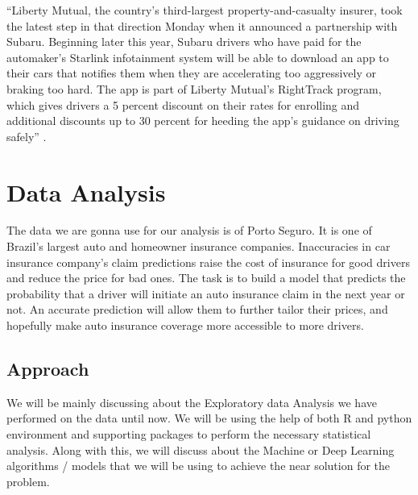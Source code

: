 ``Liberty Mutual, the country's third-largest property-and-casualty insurer, took the latest step in that direction Monday when it announced a partnership with Subaru. Beginning later this year, Subaru drivers who have paid for the automaker's Starlink infotainment system will be able to download an app to their cars that notifies them when they are accelerating too aggressively or braking too hard. The app is part of Liberty Mutual's RightTrack program, which gives drivers a 5 percent discount on their rates for enrolling and additional discounts up to 30 percent for heeding the app's guidance on driving safely'' \cite{Fung2016turn}. 

\section{Data Analysis}
The data we are gonna use for our analysis is of Porto Seguro. It is one of Brazil's largest auto and homeowner insurance companies. Inaccuracies in car insurance company's claim predictions raise the cost of insurance for good drivers and reduce the price for bad ones. The task is to build a model that predicts the probability that a driver will initiate an auto insurance claim in the next year or not. An accurate prediction will allow them to further tailor their prices, and hopefully make auto insurance coverage more accessible to more drivers. 
\\
\subsection{Approach}
We will be mainly discussing about the Exploratory data Analysis we have  performed on the data until now. We will be using the help of both R and python environment and supporting packages to perform the necessary statistical analysis. Along with this, we will discuss  about  the  Machine  or  Deep  Learning  algorithms  / models that we will be using to achieve the near solution for the problem.

